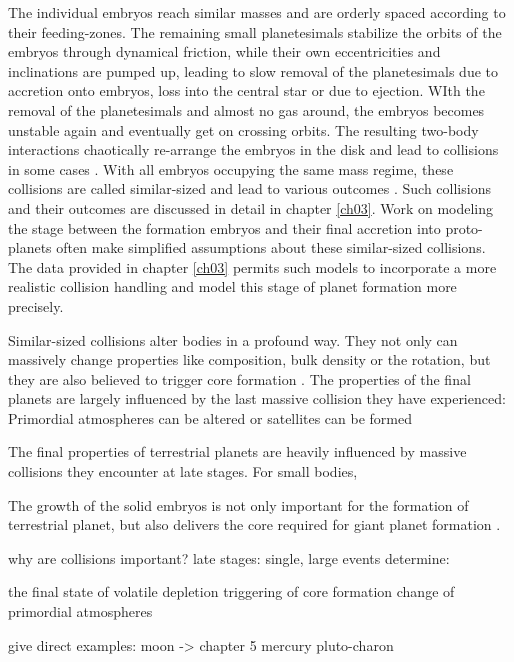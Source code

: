 The individual embryos reach similar masses and are orderly spaced according to their feeding-zones. The remaining small planetesimals stabilize the orbits of the embryos through dynamical friction, while their own eccentricities and inclinations are pumped up, leading to slow removal of the planetesimals due to accretion onto embryos, loss into the central star or due to ejection. WIth the removal of the planetesimals and almost no gas around, the embryos becomes unstable again and eventually get on crossing orbits. The resulting two-body interactions chaotically re-arrange the embryos in the disk and lead to collisions in some cases \cite{Chambers:2001p2105, Chambers:2004p4098}. With all embryos occupying the same mass regime, these collisions are called similar-sized and lead to various outcomes \cite{Asphaug:2010p3539}. Such collisions and their outcomes are discussed in detail in chapter \ref{ch03}. Work on modeling the stage between the formation embryos and their final accretion into proto-planets often make simplified assumptions about these similar-sized collisions. The data provided in chapter \ref{ch03} permits such models to incorporate a more realistic collision handling and model this stage of planet formation more precisely. 

Similar-sized collisions alter bodies in a profound way. They not only can massively change properties like composition, bulk density or the rotation, but they are also believed to trigger core formation \cite{1992Icar..100..326T}. The properties of the final planets are largely influenced by the last massive collision they have experienced: Primordial atmospheres \cite{2002DPS....34.2804A} can be altered or satellites can be formed 

The final properties of terrestrial planets are heavily influenced by massive collisions they encounter at late stages. For small bodies, 

The growth of the solid embryos is not only important for the formation of terrestrial planet, but also delivers the core required for giant planet formation \citep{1996Icar..124...62P}. 


why are collisions important?
late stages: single, large events determine:

the final state of volatile depletion \citep{2001E&PSL.192..545H}
triggering of core formation 
change of primordial atmospheres 

give direct examples:
moon -> chapter 5 \cite{Canup:2001p1861} \cite{1987Icar...71...30B} \cite{1975Icar...24..504H} \cite{1976LPI.....7..120C}
mercury \cite{Benz:1988p3336}
pluto-charon \cite{Canup:2005p1987}


